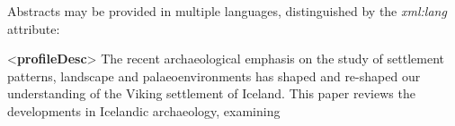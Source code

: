Abstracts may be provided in multiple languages, distinguished by the {\itshape xml:lang} attribute: \par\bgroup{}\exampleFont \begin{shaded}\noindent\mbox{}{<\textbf{profileDesc}>}\mbox{}\newline 
{}\mbox{}\newline 
\hspace*{1em}The recent archaeological emphasis\mbox{}\newline 
\hspace*{1em}\hspace*{1em}\hspace*{1em}\hspace*{1em} on the study of settlement patterns,\mbox{}\newline 
\hspace*{1em}\hspace*{1em}\hspace*{1em}\hspace*{1em} landscape and palaeoenvironments has\mbox{}\newline 
\hspace*{1em}\hspace*{1em}\hspace*{1em}\hspace*{1em} shaped and re-shaped our understanding\mbox{}\newline 
\hspace*{1em}\hspace*{1em}\hspace*{1em}\hspace*{1em} of the Viking settlement of Iceland.\mbox{}\newline 
\hspace*{1em}\hspace*{1em}\hspace*{1em}\hspace*{1em} This paper reviews the developments\mbox{}\newline 
\hspace*{1em}\hspace*{1em}\hspace*{1em}\hspace*{1em} in Icelandic archaeology, examining\mbox{}\newline 

\end{shaded}
